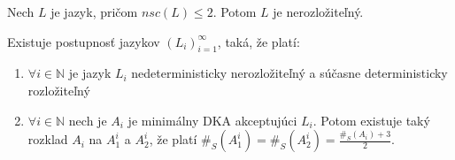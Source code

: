 \documentclass{svk_short_sk}
\begin{document}
\begin{theorem}
\label{thm:too_small_nsc}
Nech $ L $ je jazyk, pričom $ nsc(L) \leq 2 $. Potom $ L $ je nerozložiteľný.
\end{theorem}

\begin{theorem}
\label{thm:ndet_vs_det_diff_big}
Existuje postupnosť jazykov $  (L_i)_{i=1}^{\infty} $, taká, že platí:
\begin{enumerate}[label=(\alph*)]
\item $ \forall i \in \mathbb{N} $ je jazyk $ L_i $ nedeterministicky nerozložiteľný a súčasne deterministicky rozložiteľný
\item $ \forall i \in \mathbb{N} $ nech je $ A_i $ je minimálny DKA akceptujúci $ L_i $. Potom existuje taký rozklad $ A_i $ na $ A_1^i $ a $ A_2^i $, že platí $ \#_S(A_1^i)=\#_S(A_2^i)=\frac{\#_S(A_i)+3}{2} $.
\end{enumerate}
\end{theorem}

 



\end{document}
